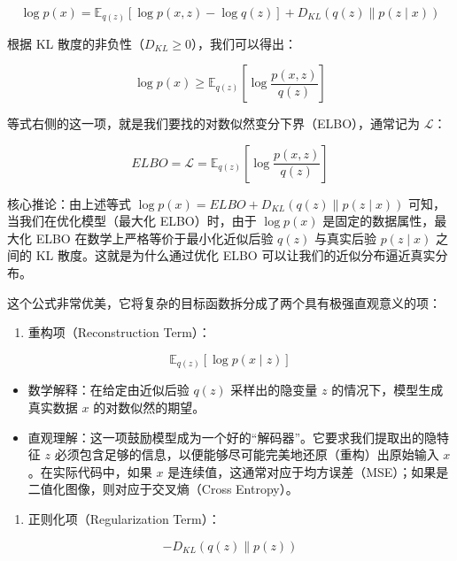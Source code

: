 \[
\log p(x)=\mathbb{E}_{q(z)}[\log p(x,z)-\log q(z)]+D_{KL}(q(z)\parallel p(z\mid x))
\]

根据 KL 散度的非负性（\(D_{KL}\ge 0\)），我们可以得出：

\[
\log p(x)\ge \mathbb{E}_{q(z)}\left[\log\frac{p(x,z)}{q(z)}\right]
\]

等式右侧的这一项，就是我们要找的对数似然变分下界（ELBO），通常记为 \(\mathcal{L}\)：

\[
ELBO=\mathcal{L}=\mathbb{E}_{q(z)}\left[\log\frac{p(x,z)}{q(z)}\right]
\]

核心推论：由上述等式 \(\log p(x)=ELBO+D_{KL}(q(z)\parallel p(z\mid x))\) 可知，当我们在优化模型（最大化 ELBO）时，由于 \(\log p(x)\) 是固定的数据属性，最大化 ELBO 在数学上严格等价于最小化近似后验 \(q(z)\) 与真实后验 \(p(z\mid x)\) 之间的 KL 散度。这就是为什么通过优化 ELBO 可以让我们的近似分布逼近真实分布。

这个公式非常优美，它将复杂的目标函数拆分成了两个具有极强直观意义的项：

\begin{enumerate}
\def\labelenumi{\arabic{enumi}.}
\tightlist
\item
{}
  重构项（Reconstruction Term）：
\end{enumerate}

\[
\mathbb{E}_{q(z)}[\log p(x \mid z)]
\]

\begin{itemize}
\tightlist
\item
  数学解释：在给定由近似后验 \(q(z)\) 采样出的隐变量 \(z\) 的情况下，模型生成真实数据 \(x\) 的对数似然的期望。
\item
  直观理解：这一项鼓励模型成为一个好的``解码器''。它要求我们提取出的隐特征 \(z\) 必须包含足够的信息，以便能够尽可能完美地还原（重构）出原始输入 \(x\)。在实际代码中，如果 \(x\) 是连续值，这通常对应于均方误差（MSE）；如果是二值化图像，则对应于交叉熵（Cross Entropy）。
\end{itemize}

\begin{enumerate}
\def\labelenumi{\arabic{enumi}.}
\setcounter{enumi}{1}
\tightlist
\item
{}
  正则化项（Regularization Term）：
\end{enumerate}

\[
- D_{KL}(q(z)\parallel p(z))
\]


